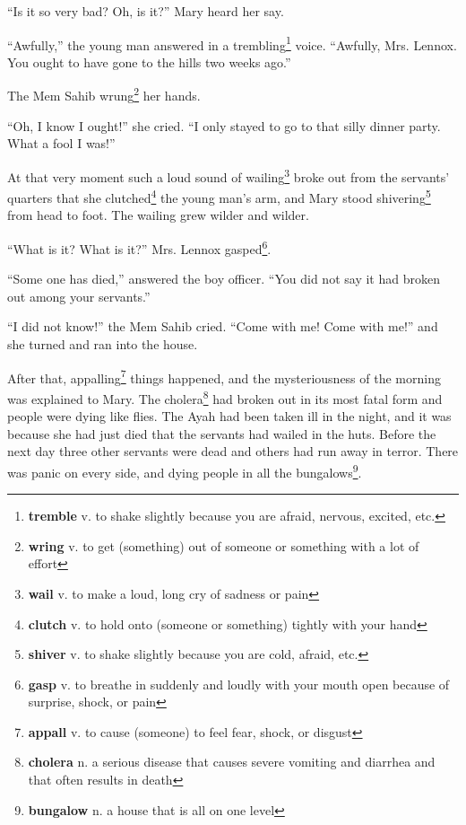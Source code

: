 ``Is it so very bad? Oh, is it?'' Mary heard her say.

``Awfully,'' the young man answered in a trembling\footnote{\textbf{tremble} v. to shake slightly because you are afraid, nervous, excited, etc.} voice. ``Awfully, Mrs. Lennox. You ought to have gone to the hills two weeks ago.''

The Mem Sahib wrung\footnote{\textbf{wring} v. to get (something) out of someone or something with a lot of effort} her hands.

``Oh, I know I ought!'' she cried. ``I only stayed to go to that silly dinner party. What a fool I was!''

At that very moment such a loud sound of wailing\footnote{\textbf{wail} v. to make a loud, long cry of sadness or pain} broke out from the servants' quarters that she clutched\footnote{\textbf{clutch} v. to hold onto (someone or something) tightly with your hand} the young man's arm, and Mary stood shivering\footnote{\textbf{shiver} v. to shake slightly because you are cold, afraid, etc.} from head to foot. The wailing grew wilder and wilder.

``What is it? What is it?'' Mrs. Lennox gasped\footnote{\textbf{gasp} v. to breathe in suddenly and loudly with your mouth open because of surprise, shock, or pain}.

``Some one has died,'' answered the boy officer. ``You did not say it had broken out among your servants.''

``I did not know!'' the Mem Sahib cried. ``Come with me! Come with me!'' and she turned and ran into the house.

After that, appalling\footnote{\textbf{appall} v. to cause (someone) to feel fear, shock, or disgust} things happened, and the mysteriousness of the morning was explained to Mary. The cholera\footnote{\textbf{cholera} n. a serious disease that causes severe vomiting and diarrhea and that often results in death} had broken out in its most fatal form and people were dying like flies. The Ayah had been taken ill in the night, and it was because she had just died that the servants had wailed in the huts. Before the next day three other servants were dead and others had run away in terror. There was panic on every side, and dying people in all the bungalows\footnote{\textbf{bungalow} n. a house that is all on one level}.
